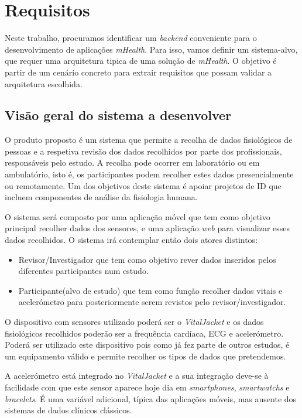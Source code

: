 \chapter{Requisitos}
Neste trabalho, procuramos identificar um \textit{backend} conveniente para o desenvolvimento de aplicações \textit{mHealth}. Para isso, vamos definir um sistema-alvo, que requer uma arquitetura tipica de uma solução de \textit{mHealth}. O objetivo é partir de um cenário concreto para extrair requisitos que possam validar a arquitetura escolhida.
\section{Visão geral do sistema a desenvolver}
O produto proposto é um sistema que permite a recolha de dados fisiológicos de pessoas e a respetiva revisão dos dados recolhidos por parte dos profissionais, responsáveis pelo estudo. A recolha pode ocorrer em laboratório ou em ambulatório, isto é, os participantes podem recolher estes dados presencialmente ou remotamente. Um dos objetivos deste sistema é apoiar projetos de \gls{ID} que incluem componentes de análise da fisiologia humana.
\par 
O sistema será composto por uma aplicação móvel que tem como objetivo principal recolher dados dos sensores, e uma aplicação \textit{web} para visualizar esses dados recolhidos. O sistema irá contemplar então dois atores distintos:
\begin{itemize}
  \item Revisor/Investigador que tem como objetivo rever dados inseridos pelos diferentes participantes num estudo.
  \item Participante(alvo de estudo) que tem como função recolher dados vitais e acelerómetro para posteriormente serem revistos pelo revisor/investigador.
\end{itemize}

O dispositivo com sensores utilizado poderá ser o \textit{VitalJacket} \cite{vj} e os dados fisiológicos recolhidos poderão ser a frequência cardíaca, \gls{ECG} e acelerómetro. Poderá ser utilizado este dispositivo pois como já fez parte de outros estudos, é um equipamento válido e permite recolher os tipos de dados que pretendemos. \par 
A acelerómetro está integrado no \textit{VitalJacket} e a sua integração deve-se à facilidade com que este sensor aparece hoje dia em \textit{smartphones}, \textit{smartwatchs} e \textit{bracelets}. É uma variável adicional, típica das aplicações móveis, mas ausente dos sistemas de dados clínicos clássicos.  
\newpage
